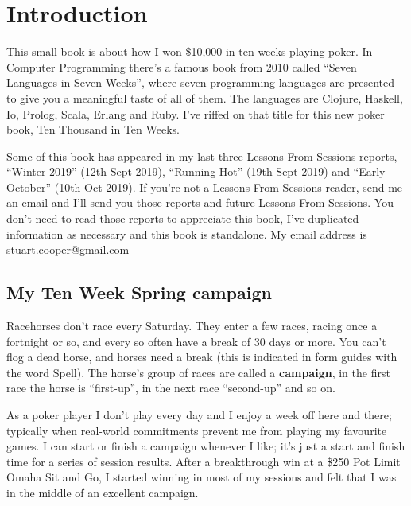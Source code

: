 \chapter{Introduction}


This small book is about how I won \$10,000 in ten weeks playing
poker. In Computer Programming there's a famous book from
2010 called ``Seven Languages in Seven Weeks'', where seven
programming languages are presented to give you a meaningful taste of
all of them. The languages are Clojure, Haskell, Io, Prolog, Scala,
Erlang and Ruby. I've riffed on that title for this new
poker book, Ten Thousand in Ten Weeks.

Some of this book has appeared in my last three Lessons From Sessions
reports, ``Winter 2019'' (12th Sept 2019), ``Running Hot'' (19th Sept
2019) and ``Early October'' (10th Oct 2019). If you're not a Lessons
From Sessions reader, send me an email and I'll send you those reports
and future Lessons From Sessions. You don't need to read those reports
to appreciate this book, I've duplicated information as necessary and
this book is standalone. My email address is stuart.cooper@gmail.com

\section*{My Ten Week Spring campaign}

Racehorses don't race every Saturday. They enter a few races, racing
once a fortnight or so, and every so often have a break of 30 days or
more. You can't flog a dead horse, and horses need a break (this is
indicated in form guides with the word Spell). The horse's group of
races are called a \textbf{campaign}, in the first race the horse is
``first-up'', in the next race ``second-up'' and so on.

As a poker player I don't play every day and I enjoy a week off here
and there; typically when real-world commitments prevent me from
playing my favourite games. I can start or finish a campaign whenever
I like; it's just a start and finish time for a series of session
results. After a breakthrough win at a \$250 Pot Limit Omaha Sit and
Go, I started winning in most of my sessions and felt that I was in
the middle of an excellent campaign.

